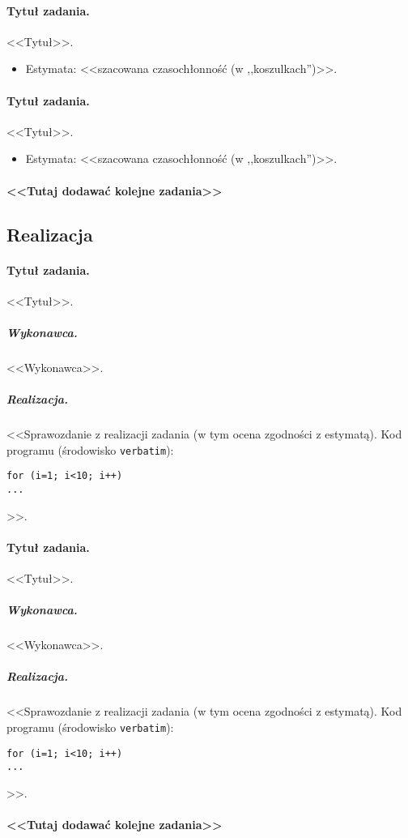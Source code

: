 \documentclass[a4paper]{article}
\begin{document}
\paragraph{Tytuł zadania.} <<Tytuł>>.
\begin{itemize}
	\item Estymata: <<szacowana czasochłonność (w ,,koszulkach'')>>.
\end{itemize}

\paragraph{Tytuł zadania.} <<Tytuł>>.
\begin{itemize}
	\item Estymata: <<szacowana czasochłonność (w ,,koszulkach'')>>.
\end{itemize}

\paragraph{<<Tutaj dodawać kolejne zadania>>}

\subsection{Realizacja}

\paragraph{Tytuł zadania.} <<Tytuł>>.
\subparagraph{Wykonawca.} <<Wykonawca>>.
\subparagraph{Realizacja.} <<Sprawozdanie z realizacji zadania (w tym ocena zgodności z estymatą). Kod programu (środowisko \texttt{verbatim}): \begin{verbatim}
for (i=1; i<10; i++)
...
\end{verbatim}>>.

\paragraph{Tytuł zadania.} <<Tytuł>>.
\subparagraph{Wykonawca.} <<Wykonawca>>.
\subparagraph{Realizacja.} <<Sprawozdanie z realizacji zadania (w tym ocena zgodności z estymatą). Kod programu (środowisko \texttt{verbatim}): \begin{verbatim}
for (i=1; i<10; i++)
...
\end{verbatim}>>.

\paragraph{<<Tutaj dodawać kolejne zadania>>}
\end{document}
